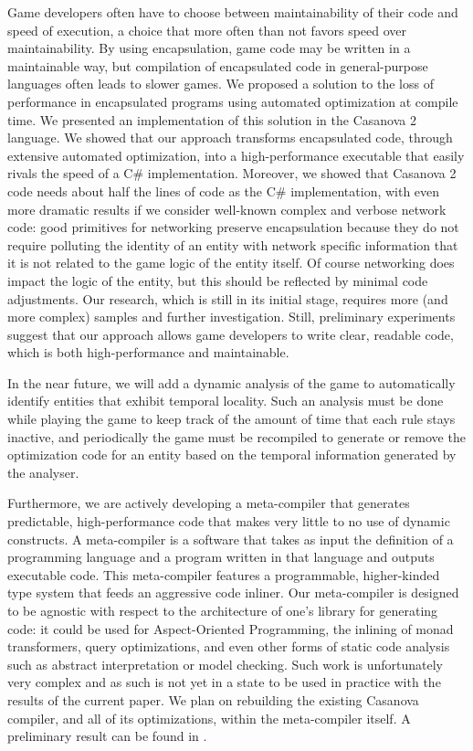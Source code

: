 Game developers often have to choose between maintainability of their code and speed of execution, a choice that more often than not favors speed over maintainability. By using encapsulation, game code may be written in a maintainable way, but compilation of encapsulated code in general-purpose languages often leads to slower games. We proposed a solution to the loss of performance in encapsulated programs using automated optimization at compile time. 
We presented an implementation of this solution in the Casanova 2 language. We showed that our approach transforms encapsulated code, through extensive automated optimization, into a high-performance executable that easily rivals the speed of a C\# implementation. Moreover, we showed that Casanova 2 code needs about half the lines of code as the C\# implementation, with even more dramatic results if we consider well-known complex and verbose network code: good primitives for networking preserve encapsulation because they do not require polluting the identity of an entity with network specific information that it is not related to the game logic of the entity itself. Of course networking does impact the logic of the entity, but this should be reflected by minimal code adjustments. Our research, which is still in its initial stage, requires more (and more complex) samples and further investigation. Still, preliminary experiments suggest that our approach allows game developers to write clear, readable code, which is both high-performance and maintainable. 

In the near future, we will add a dynamic analysis of the game to automatically identify entities that exhibit temporal locality. Such an analysis must be done while playing the game to keep track of the amount of time that each rule stays inactive, and periodically the game must be recompiled to generate or remove the optimization code for an entity based on the temporal information generated by the analyser. 

Furthermore, we are actively developing a meta-compiler that generates predictable, high-performance code that makes very little to no use of dynamic constructs. A meta-compiler is a software that takes as input the definition of a programming language and a program written in that language and outputs executable code. This meta-compiler features a programmable, higher-kinded type system that feeds an aggressive code inliner. Our meta-compiler is designed to be agnostic with respect to the architecture of one's library for generating code: it could be used for Aspect-Oriented Programming, the inlining of monad transformers, query optimizations, and even other forms of static code analysis such as abstract interpretation or model checking. Such work is unfortunately very complex and as such is not yet in a state to be used in practice with the results of the current paper. We plan on rebuilding the existing Casanova compiler, and all of its optimizations, within the meta-compiler itself. A preliminary result can be found in \cite{meta_casanova}.


